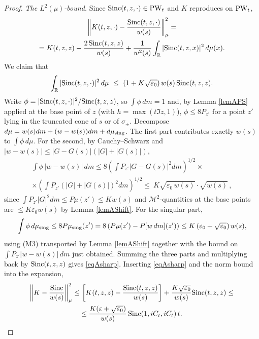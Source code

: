 \documentclass[11pt,twoside,reqno]{amsart}
\def\PW{\text{\rm PW}}
\def\R{{\mathbb R}}
\def\MM{{\mathcal M}}
\def\e{\varepsilon}
\def\s{\sigma}
\def\S{\text{\rm Sinc}}
\theoremstyle{plain}
\numberwithin{equation}{section}
\begin{document}
\begin{proof}
{\it The $L^2(\mu)$-bound.} Since $\S(t,z,\cdot)\in\PW_t$ and $K$ reproduces on $\PW_t$,
$$\begin{gathered}\left\|K(t,z,\cdot)-\frac{\S(t,z,\cdot)}{w(s)}\right\|^2_\mu
=\\ = K(t,z,z)-\frac{2\,\S(t,z,z)}{w(s)}+\frac1{w^2(s)}\int_\R|\S(t,z,x)|^2\,d\mu(x).\end{gathered}$$
We claim that
\begin{equation}
\int_\R|\S(t,z,\cdot)|^2\,d\mu\ \leq\ \left(1+K\sqrt{\e_0}\right)w(s)\,\S(t,z,z) .
\label{eqAsharp}
\end{equation}
Write $\phi=|\S(t,z,\cdot)|^2/\S(t,z,z)$, so $\int\phi\,dm=1$ and, by Lemma \ref{lemAPS} applied at the base point of $z$ (with $h=\max(t\Im z,1)$), $\phi\leq8P_{z'}$ for a point $z'$ lying in the truncated cone of $s$ or of $\s_\pm$. Decompose $d\mu=w(s)dm+(w-w(s))dm+d\mu_{\rm sing}$. The first part contributes exactly $w(s)$ to $\int\phi\,d\mu$. For the second, by Cauchy--Schwarz and $|w-w(s)|\leq|G-G(s)|\left(|G|+|G(s)|\right)$,
$$\begin{gathered}\int\phi\,|w-w(s)|\,dm\leq8\left(\int P_{z'}|G-G(s)|^2dm\right)^{1/2}\times\\
\times\left(\int P_{z'}\left(|G|+|G(s)|\right)^2dm\right)^{1/2}
\leq\ K\sqrt{\e_0\,w(s)}\cdot\sqrt{w(s)}\,,\end{gathered}$$
since $\int P_{z'}|G|^2dm\leq P\mu(z')\leq K w(s)$ and $\MM^2$-quantities at the base points are $\leq K\e_0w(s)$ by Lemma \ref{lemAShift}. For the singular part,
$$\int\phi\,d\mu_{\rm sing}\leq8P\mu_{\rm sing}(z')=8\left(P\mu(z')-P[w\,dm](z')\right)\leq K\left(\e_0+\sqrt{\e_0}\right)w(s),$$
using (M3) transported by Lemma \ref{lemAShift} together with the bound on $\int P_{z'}|w-w(s)|\,dm$ just obtained. Summing the three parts and multiplying back by $\S(t,z,z)$ gives \eqref{eqAsharp}. Inserting \eqref{eqAsharp} and the norm bound into the expansion,
$$\begin{gathered}\left\|K-\frac{\S}{w(s)}\right\|^2_\mu\leq\left[K(t,z,z)-\frac{\S(t,z,z)}{w(s)}\right]+\frac{K\sqrt{\e_0}}{w(s)}\S(t,z,z)
\leq\\ \leq\frac{K(\e+\sqrt{\e_0})}{w(s)}\,\S(1,iC_t,iC_t)\,t .\end{gathered}\qedhere$$
\end{proof}
\end{document}
